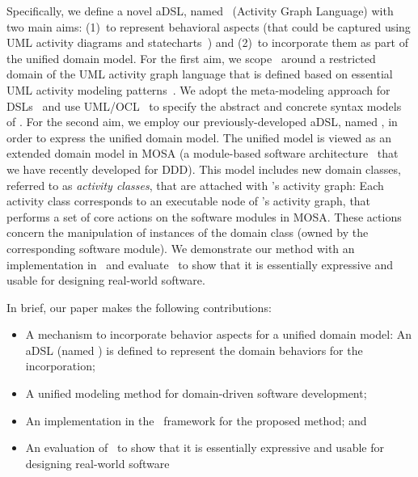 Specifically, we define a novel aDSL, named \agl~(Activity Graph Language) with two main aims: (1)~to represent behavioral aspects (that could be captured using UML activity diagrams and statecharts~\cite{omg_unified_2015}) and (2)~to incorporate them as part of the unified domain model. %
For the first aim, we scope \agl~around a restricted domain of the UML activity graph language that is defined based on essential UML activity modeling patterns~\cite{omg_unified_2015}. We adopt the meta-modeling approach for DSLs~\cite{kleppe_software_2008} and use UML/OCL~\cite{omg_unified_2015, omg_object_2014} to specify the abstract and concrete syntax models of \agl. %
For the second aim, we employ our previously-developed aDSL, named \dcsl, in order to express the unified domain model. The unified model is viewed as an extended domain model in MOSA (a module-based software architecture~\cite{le_generative_2018} that we have recently developed for DDD). 
This model includes new domain classes, referred to as \textit{activity classes}, that are attached with \agl's activity graph: Each activity class corresponds to an executable node of \agl's activity graph, that performs a set of core actions on the software modules in MOSA. These actions concern the manipulation of instances of the domain class (owned by the corresponding software module). We demonstrate our method with an implementation in \jdomainapp~and evaluate \agl~to show that it is essentially expressive and usable for designing real-world software.

In brief, our paper makes the following contributions:
%
\begin{itemize}[leftmargin=*]
	\item A mechanism to incorporate behavior aspects for a unified domain model: An aDSL (named \agl) is defined to represent the domain behaviors for the incorporation;
	\item A unified modeling method for domain-driven software development;
	\item An implementation in the \jdomainapp~framework for the proposed method; and
	\item An evaluation of \agl~to show that it is essentially expressive and usable for designing real-world software
\end{itemize}

